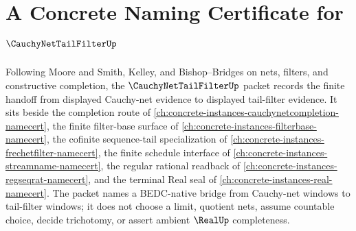\chapter{A Concrete Naming Certificate for $\CauchyNetTailFilterUp$}
\label{ch:concrete-instances-cauchy-net-tail-filter-namecert}

Following Moore and Smith, Kelley, and Bishop--Bridges on nets, filters, and constructive completion, the $\CauchyNetTailFilterUp$ packet records the finite handoff from displayed Cauchy-net evidence to displayed tail-filter evidence. It sits beside the completion route of \autoref{ch:concrete-instances-cauchynetcompletion-namecert}, the finite filter-base surface of \autoref{ch:concrete-instances-filterbase-namecert}, the cofinite sequence-tail specialization of \autoref{ch:concrete-instances-frechetfilter-namecert}, the finite schedule interface of \autoref{ch:concrete-instances-streamname-namecert}, the regular rational readback of \autoref{ch:concrete-instances-regseqrat-namecert}, and the terminal Real seal of \autoref{ch:concrete-instances-real-namecert}. The packet names a BEDC-native bridge from Cauchy-net windows to tail-filter windows; it does not choose a limit, quotient nets, assume countable choice, decide trichotomy, or assert ambient $\RealUp$ completeness.

